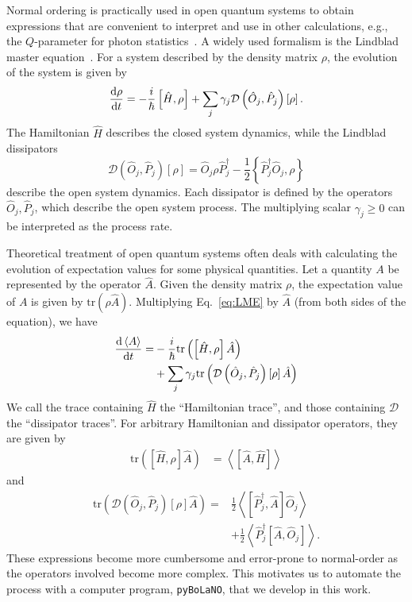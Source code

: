 \documentclass[onecolumn, 12pt, sort&compress]{elsarticle}
\newcounter{bla}
\newcommand{\trace}[1]{\mathrm{tr}\left({#1}\right)}
\newcommand{\expval}[1]{\left\langle{#1}\right\rangle}
\newcommand{\comm}[2]{\left[{#1},{#2}\right]}
\newcommand{\acomm}[2]{\left\{{#1},{#2}\right\}}
\newcommand{\dissip}[1]{\mathcal{D}\left({#1}\right)\left[\rho\right]}
\begin{document}
Normal ordering is practically used in open quantum systems to obtain expressions that are convenient to interpret and use in other calculations, e.g., the $Q$-parameter for photon statistics~\cite{gerry_introductory_2005}. A widely used formalism is the Lindblad master equation~\cite{schlosshauer_decoherence_2007, breuer_theory_2002}.  For a system described by the density matrix $\rho$, the evolution of the system is given by
\begin{equation}\label{eq:LME}
    \odv{\rho}{t} = -\frac{i}{\hbar}\comm{\hat{H}}{\rho} + \sum_j \gamma_j\dissip{\hat{O}_j, \hat{P}_j}.
\end{equation}
The Hamiltonian $\hat{H}$ describes the closed system dynamics, while the Lindblad dissipators 
\begin{equation}
    \dissip{\hat{O}_j, \hat{P}_j} = \hat{O}_j\rho\hat{P}_j^\dagger - \frac{1}{2}\acomm{\hat{P}_j^\dagger\hat{O}_j}{\rho}
\end{equation}
describe the open system dynamics. Each dissipator is defined by the operators $\hat{O}_j, \hat{P}_j$, which describe the open system process.  The multiplying scalar $\gamma_j\geq 0$ can be interpreted as the process rate. 

Theoretical treatment of open quantum systems often deals with calculating the evolution of expectation values for some physical quantities.  Let a quantity $A$ be represented by the operator $\hat{A}$.  Given the density matrix $\rho$, the expectation value of $A$ is given by $\trace{\rho \hat{A}}$.  Multiplying Eq.~\eqref{eq:LME} by $\hat{A}$ (from both sides of the equation), we have
\begin{equation}\begin{split}
    \odv{\expval{A}}{t} =& -\frac{i}{\hbar}\trace{\comm{\hat{H}}{\rho}\hat{A}} 
    \\
    &+ \sum_j \gamma_j \trace{\dissip{\hat{O}_j,\hat{P}_j}\hat{A}}
    \label{eq:LME_expval_evo}
\end{split}\end{equation}
We call the trace containing $\hat{H}$ the ``Hamiltonian trace'', and those containing $\mathcal{D}$ the ``dissipator traces''. For arbitrary Hamiltonian and dissipator operators, they are given by
\begin{align}
    \trace{\comm{\hat{H}}{\rho}\hat{A}} &= \expval{\comm{\hat{A}}{\hat{H}}}
    \label{eq:Ham_trace}
\end{align}
and
\begin{equation}\begin{split}\label{eq:dissip_trace}
    \trace{\dissip{\hat{O}_j,\hat{P}_j}\hat{A}} =& 
    \frac{1}{2}\expval{\comm{\hat{P}_j^\dagger}{\hat{A}}\hat{O}_j}
    \\
    &+\frac{1}{2}\expval{\hat{P}_j^\dagger\comm{\hat{A}}{\hat{O}_j}} .
\end{split}\end{equation}
These expressions become more cumbersome and error-prone to normal-order as the operators involved become more complex. This motivates us to automate the process with a computer program, \texttt{pyBoLaNO}, that we develop in this work.
\end{document}

